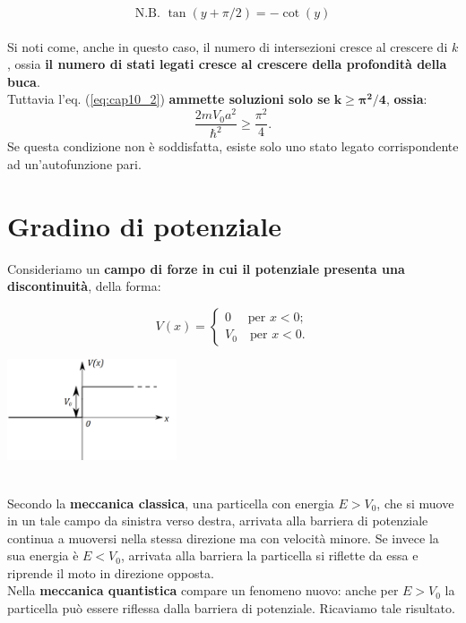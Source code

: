 \[ \textrm{N.B. } \tan (y+\pi/2) = -\cot (y) \]\\
Si noti come, anche in questo caso, il numero di intersezioni cresce al crescere di $k$, ossia \textbf{il numero di stati legati cresce al crescere della profondità della buca}.\\
Tuttavia l'eq. (\ref{eq:cap10_2}) \textbf{ammette soluzioni solo se} $\mathbf{k\geq \pi^2/4}$,\textbf{ ossia}:
\begin{equation}
\frac{2mV_0 a^2}{\hbar ^2} \geq \frac{\pi ^2}{4}.
\end{equation}
Se questa condizione non è soddisfatta, esiste solo uno stato legato corrispondente ad un'autofunzione pari.
\section{Gradino di potenziale}
Consideriamo un \textbf{campo di forze in cui il potenziale presenta una discontinuità}, della forma:\\
\begin{minipage}{.55\textwidth}
\begin{equation}
V(x)=
\begin{cases}
0 \quad \textrm{ per } x<0;\\
V_0 \quad \textrm{per } x<0.
\end{cases}
\end{equation}
\end{minipage}
\hspace{.2cm}
\begin{minipage}{.4\textwidth}
\includegraphics[width=5cm]{immagini/cap_10/fig_10_5.png}
\end{minipage}\\
Secondo la \textbf{meccanica classica}, una particella con energia $E>V_0$, che si muove in un tale campo da sinistra verso destra, arrivata alla barriera di potenziale continua a muoversi nella stessa direzione ma con velocità minore. Se invece la sua energia è $E<V_0$, arrivata alla barriera la particella si riflette da essa e riprende il moto in direzione opposta.\\
Nella \textbf{meccanica quantistica} compare un fenomeno nuovo: anche per $E>V_0$ la particella può essere riflessa dalla barriera di potenziale. Ricaviamo tale risultato.\\
